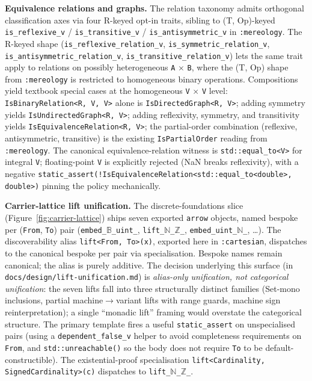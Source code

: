 \documentclass[11pt, a4paper]{report}
\begin{document}
\textbf{Equivalence relations and graphs.} The relation taxonomy admits orthogonal classification axes via four R-keyed opt-in traits, sibling to (T, Op)-keyed \texttt{is\_reflexive\_v} / \texttt{is\_transitive\_v} / \texttt{is\_antisymmetric\_v} in \texttt{:mereology}. The R-keyed shape (\texttt{is\_reflexive\_relation\_v}, \texttt{is\_symmetric\_relation\_v}, \texttt{is\_antisymmetric\_relation\_v}, \texttt{is\_transitive\_relation\_v}) lets the same trait apply to relations on possibly heterogeneous \texttt{A} $\times$ \texttt{B}, where the (T, Op) shape from \texttt{:mereology} is restricted to homogeneous binary operations. Compositions yield textbook special cases at the homogeneous \texttt{V} $\times$ \texttt{V} level: \texttt{IsBinaryRelation<R, V, V>} alone is \texttt{IsDirectedGraph<R, V>}; adding symmetry yields \texttt{IsUndirectedGraph<R, V>}; adding reflexivity, symmetry, and transitivity yields \texttt{IsEquivalenceRelation<R, V>}; the partial-order combination (reflexive, antisymmetric, transitive) is the existing \texttt{IsPartialOrder} reading from \texttt{:mereology}. The canonical equivalence-relation witness is \texttt{std::equal\_to<V>} for integral \texttt{V}; floating-point \texttt{V} is explicitly rejected (NaN breaks reflexivity), with a negative \texttt{static\_assert(!IsEquivalenceRelation<std::equal\_to<double>, double>)} pinning the policy mechanically.

\textbf{Carrier-lattice lift unification.} The discrete-foundations slice (Figure~\ref{fig:carrier-lattice}) ships seven exported \texttt{arrow} objects, named bespoke per (\texttt{From}, \texttt{To}) pair (\texttt{embed\_$\mathbb{B}$\_uint\_}, \texttt{lift\_$\mathbb{N}$\_$\mathbb{Z}$\_}, \texttt{embed\_uint\_$\mathbb{N}$\_}, \ldots). The discoverability alias \texttt{lift<From, To>(x)}, exported here in \texttt{:cartesian}, dispatches to the canonical bespoke per pair via specialisation. Bespoke names remain canonical; the alias is purely additive. The decision underlying this surface (in \texttt{docs/design/lift-unification.md}) is \emph{alias-only unification, not categorical unification}: the seven lifts fall into three structurally distinct families (Set-mono inclusions, partial machine$\to$variant lifts with range guards, machine sign reinterpretation); a single ``monadic lift'' framing would overstate the categorical structure. The primary template fires a useful \texttt{static\_assert} on unspecialised pairs (using a \texttt{dependent\_false\_v} helper to avoid completeness requirements on \texttt{From}, and \texttt{std::unreachable()} so the body does not require \texttt{To} to be default-constructible). The existential-proof specialisation \texttt{lift<Cardinality, SignedCardinality>(c)} dispatches to \texttt{lift\_$\mathbb{N}$\_$\mathbb{Z}$\_}.
\end{document}
